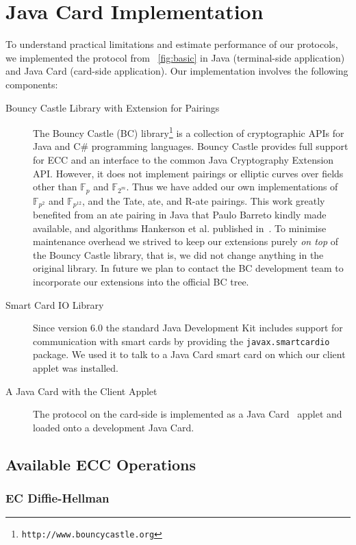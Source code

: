 \section{Java Card Implementation}

To understand practical limitations and estimate performance of our protocols,
we implemented the protocol from \figurename~\ref{fig:basic} in Java
(terminal-side application) and Java Card (card-side application).
Our implementation involves the following components:
\begin{description}
\item[Bouncy Castle Library with Extension for Pairings] The Bouncy
  Castle (BC) library\footnote{\texttt{http://www.bouncycastle.org}} is a
  collection of cryptographic APIs for Java and C\# programming
  languages. Bouncy Castle provides full support for ECC and an
  interface to the common Java Cryptography Extension API. However, it
  does not implement pairings or elliptic curves over fields other
  than $\mathbb{F}_p$ and $\mathbb{F}_{2^m}$. Thus we have added our
  own implementations of $\mathbb{F}_{p^2}$ and $\mathbb{F}_{p^{12}}$,
  and the Tate, ate, and R-ate pairings.
This work greatly benefited
  from an ate pairing in Java that Paulo Barreto kindly made
  available, and algorithms Hankerson et al. published
  in~\cite{HankersonMS09}.
  To minimise maintenance overhead we strived
  to keep our extensions purely \emph{on top} of the Bouncy Castle
  library, that is, we did not change anything in the original
  library. In future we plan to contact the BC development team to
  incorporate our extensions into the official BC tree.
\item[Smart Card IO Library] Since version 6.0 the standard Java Development Kit
  includes support for communication with smart cards by providing the
  \texttt{javax.smartcardio} package. We used it to talk to a Java Card smart card
  on which our client applet was installed.
\item[A Java Card with the Client Applet] The protocol on the card-side is
  implemented as a Java Card~\cite{Chen00} applet and loaded onto
  a development Java Card.
\end{description}


\subsection{Available ECC Operations}

\subsubsection{EC Diffie-Hellman}

